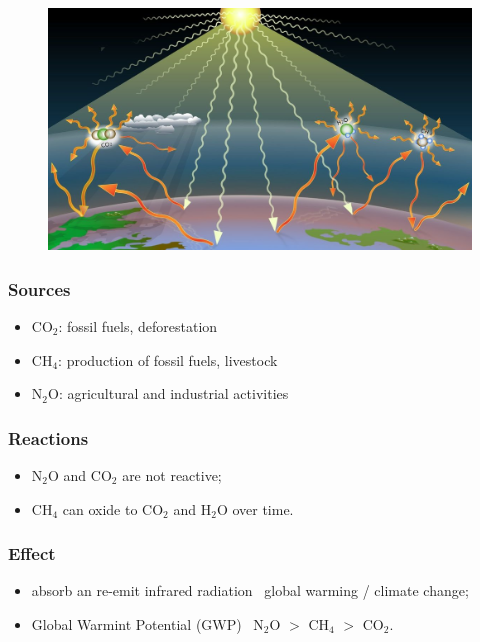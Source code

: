 \documentclass{article}
\newcommand{\cfig}[1]{%
  \begin{figure}[ht!]%
    \centering%
    #1%
  \end{figure}%
}
\begin{document}
\cfig{\includegraphics*[width=.8\textwidth]{media/Treibhauseffekt-Graphik.jpg}}

\subsubsection{Sources}
\begin{itemize}
    \item CO$_2$: fossil fuels, deforestation \quad {}
    \item CH$_4$: production of fossil fuels, livestock \quad {}
    \item N$_2$O: agricultural and industrial activities \quad
\end{itemize}

\subsubsection{Reactions}
\begin{itemize}
    \item N$_2$O and CO$_2$ are not reactive;
    \item CH$_4$ can oxide to CO$_2$ and H$_2$O over time.
\end{itemize}

\subsubsection{Effect}
\begin{itemize}
    \item absorb an re-emit infrared radiation \textrightarrow\ global warming / climate change;
    \item Global Warmint Potential (GWP) \textrightarrow\ N$_2$O $>$ CH$_4$ $>$ CO$_2$.
\end{itemize}
\end{document}
